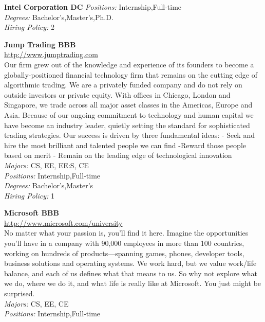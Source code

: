 \documentclass[twoside]{article}
\begin{document}
\begin{center}
\begin{multicols}{2}
\begin{minipage}{.95\columnwidth}{\Large\bf Intel Corporation \hfill DC}
    \emph{Positions:} Internship,Full-time\\
    \emph{Degrees:} Bachelor's,Master's,Ph.D.\\
    \emph{Hiring Policy:} 2\\
\end{minipage}
 \begin{minipage}{.95\columnwidth}{\Large\bf Jump Trading \hfill BBB}\\
    \url{http://www.jumptrading.com}\\
    Our firm grew out of the knowledge and experience of its founders to become a globally-positioned financial technology firm that remains on the cutting edge of algorithmic trading. We are a privately funded company and do not rely on outside investors or private equity. With offices in Chicago, London and Singapore, we trade across all major asset classes in the Americas, Europe and Asia. Because of our ongoing commitment to technology and human capital we have become an industry leader, quietly setting the standard for sophisticated trading strategies. Our success is driven by three fundamental ideas: - Seek and hire the most brilliant and talented people we can find -Reward those people based on merit - Remain on the leading edge of technological innovation\\
    \emph{Majors:} CS, EE, EE:S, CE\\
    \emph{Positions:} Internship,Full-time\\
    \emph{Degrees:} Bachelor's,Master's\\
    \emph{Hiring Policy:} 1\\
\end{minipage}
 \begin{minipage}{.95\columnwidth}{\Large\bf Microsoft \hfill BBB}\\
    \url{http://www.microsoft.com/university}\\
    No matter what your passion is, you’ll find it here. Imagine the opportunities you’ll have in a company with 90,000 employees in more than 100 countries, working on hundreds of products—spanning games, phones, developer tools, business solutions and operating systems. We work hard, but we value work/life balance, and each of us defines what that means to us. So why not explore what we do, where we do it, and what life is really like at Microsoft. You just might be surprised.\\
    \emph{Majors:} CS, EE, CE\\
    \emph{Positions:} Internship,Full-time\\

\end{minipage}
\end{multicols}
\end{center}
\end{document}
